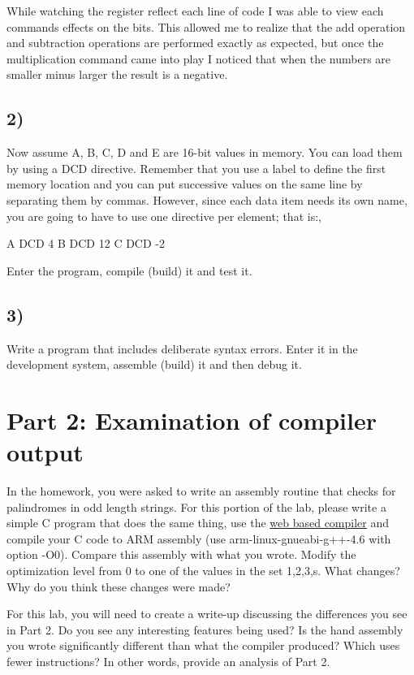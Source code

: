 \documentclass[letterpaper,12pt,titlepage]{article}
\begin{document}
While watching the register reflect each line of code I was able to view each commands effects on the bits. This allowed me to realize that the add operation and subtraction operations are performed exactly as expected, but once the multiplication command came into play I noticed that when the numbers are smaller minus larger the result is a negative. 

 
\subsection*{2)} Now assume A, B, C, D and E are 16-bit values in memory. You can load them by using a DCD directive. Remember that you use a label to define the first memory location and you can put successive values on the same line by  separating them by commas. However, since each data item needs its own name, you are going to have to use one directive per element; that is:,  

A   DCD  4
B   DCD  12
C   DCD  -2
 
Enter the program, compile (build) it and test it.
 
\subsection*{3)} Write a program that includes deliberate syntax errors.   Enter it in the development system, assemble (build) it and
then debug it. 



\newpage
\section*{Part 2: Examination of compiler output}
In the homework, you were asked to write an assembly routine that checks for palindromes in odd length strings. For this portion of the lab, please write a simple C program that does the same thing, use the \href{http://gcc.godbolt.org}{web based compiler} and compile your  C code to ARM assembly (use arm-linux-gnueabi-g++-4.6 with option -O0). Compare this assembly with what you wrote. Modify the optimization level from 0 to one of the values in the set {1,2,3,s}. What changes? Why do you think these changes were made?

For this lab, you will need to create a write-up discussing the differences you see in Part 2. Do you see any interesting features being used? Is the hand assembly you wrote significantly different than what the compiler produced? Which uses fewer instructions? In other words, provide an analysis of Part 2.

%
\end{document}
